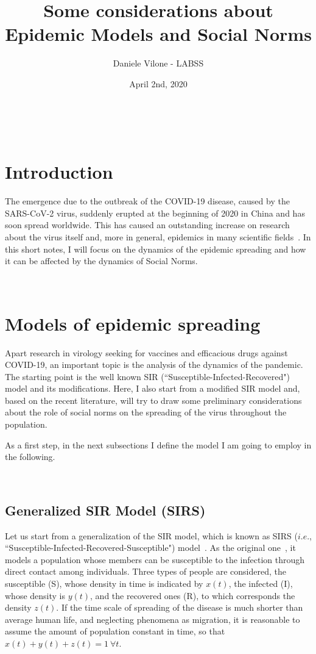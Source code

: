 \documentclass{article}
\title{Some considerations about Epidemic Models and Social Norms}
\author{Daniele Vilone - LABSS}
\date{April 2nd, 2020}
\begin{document}
\maketitle

\ 

\section{Introduction}

The emergence due to the outbreak of the COVID-19 disease, caused by the SARS-CoV-2 virus, suddenly erupted at the beginning of 2020 in China and has soon spread worldwide. This has caused an outstanding increase on research about the virus itself and, more in general, epidemics in many scientific fields~\cite{mar20}. In this short notes, I will focus on the dynamics of the epidemic spreading and how it can be affected by the dynamics of Social Norms.

\ 

\section{Models of epidemic spreading}

Apart research in virology seeking for vaccines and efficacious drugs against COVID-19, an important topic is the analysis of the dynamics of the pandemic. The starting point is the well known SIR (``Susceptible-Infected-Recovered") model and its modifications. Here, I also start from a modified SIR model and, based on the recent literature, will try to draw some preliminary considerations about the role of social norms on the spreading of the virus throughout the population.

As a first step, in the next subsections I define the model I am going to employ in the following.

\ 

\subsection*{Generalized SIR Model (SIRS)}

Let us start from a generalization of the SIR model, which is known as SIRS ($i.e.$, \newline ``Susceptible-Infected-Recovered-Susceptible") model~\cite{gon11}. As the original one~\cite{ker27}, it models a population whose members can be susceptible to the infection through direct contact among individuals. Three types of people are considered, the susceptible (S), whose density in time is indicated by $x(t)$, the infected (I), whose density is $y(t)$, and the recovered ones (R), to which corresponds the density $z(t)$. If the time scale of spreading of the disease is much shorter than average human life, and neglecting phenomena as migration, it is reasonable to assume the amount of population constant in time, so that $x(t)+y(t)+z(t)=1\ \forall t$.
\end{document}
